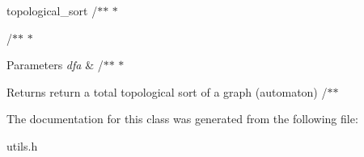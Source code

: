 topological\+\_\+sort /$\ast$$\ast$ $\ast$ 

/$\ast$$\ast$ $\ast$ 
\begin{DoxyParams}{Parameters}
{\em dfa} & /$\ast$$\ast$ $\ast$ \\
\hline
\end{DoxyParams}
\begin{DoxyReturn}{Returns}
return a total topological sort of a graph (automaton) /$\ast$$\ast$ 
\end{DoxyReturn}


The documentation for this class was generated from the following file\+:\begin{DoxyCompactItemize}
\item 
utils.\+h\end{DoxyCompactItemize}
